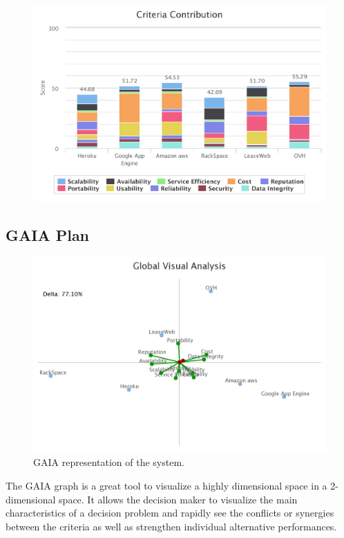 \documentclass[a4paper,11pt]{article}
\begin{document}
\begin{figure}[h]
  \center
  \includegraphics[width=\textwidth-5cm]{img/Result/criteria_contribution.pdf}
\end{figure}

\subsection{GAIA Plan}

\begin{figure}
  \centering
  \includegraphics[width=\textwidth-2cm]{img/Result/gaia_plane.png}
  \caption{GAIA representation of the system.}
  \label{fig:gaia}
\end{figure}

The GAIA graph is a great tool to visualize a highly dimensional space in a 2-dimensional space. It allows the decision maker to visualize the main characteristics of a decision problem and rapidly see the conflicts or synergies between the criteria as well as strengthen individual alternative performances.
\end{document}
